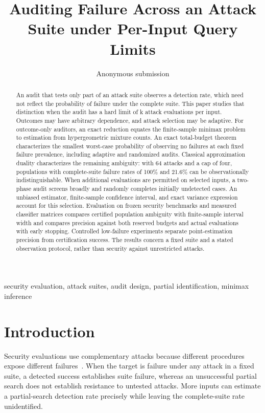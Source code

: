 \documentclass[conference]{IEEEtran}
\title{Auditing Failure Across an Attack Suite under Per-Input Query Limits}
\author{Anonymous submission}
\begin{document}
\maketitle
\begin{abstract}
An audit that tests only part of an attack suite observes a detection rate, which need not reflect the probability of failure under the complete suite. This paper studies that distinction when the audit has a hard limit of k attack evaluations per input. Outcomes may have arbitrary dependence, and attack selection may be adaptive. For outcome-only auditors, an exact reduction equates the finite-sample minimax problem to estimation from hypergeometric mixture counts. An exact total-budget theorem characterizes the smallest worst-case probability of observing no failures at each fixed failure prevalence, including adaptive and randomized audits. Classical approximation duality characterizes the remaining ambiguity: with 64 attacks and a cap of four, populations with complete-suite failure rates of 100\% and 21.6\% can be observationally indistinguishable. When additional evaluations are permitted on selected inputs, a two-phase audit screens broadly and randomly completes initially undetected cases. An unbiased estimator, finite-sample confidence interval, and exact variance expression account for this selection. Evaluation on frozen security benchmarks and measured classifier matrices compares certified population ambiguity with finite-sample interval width and compares precision against both reserved budgets and actual evaluations with early stopping. Controlled low-failure experiments separate point-estimation precision from certification success. The results concern a fixed suite and a stated observation protocol, rather than security against unrestricted attacks.
\end{abstract}
\begin{IEEEkeywords}
security evaluation, attack suites, audit design, partial identification, minimax inference
\end{IEEEkeywords}

\section{Introduction}
Security evaluations use complementary attacks because different procedures expose different failures~\cite{carlini,croce}. When the target is failure under any attack in a fixed suite, a detected success establishes suite failure, whereas an unsuccessful partial search does not establish resistance to untested attacks. More inputs can estimate a partial-search detection rate precisely while leaving the complete-suite rate unidentified.
\end{document}
